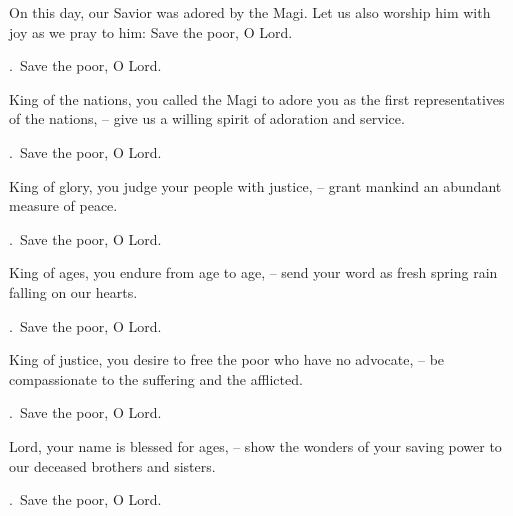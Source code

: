 \lettrine[loversize=0.15,lines=2]{O}{}n this day, our Savior was adored by the Magi. Let us also worship him with joy as we pray to him: Save the poor, O Lord.
\par \Rbar.~Save the poor, O Lord.

King of the nations, you called the Magi to adore you as the first representatives of the nations,
– give us a willing spirit of adoration and service.
\par \Rbar.~Save the poor, O Lord.

King of glory, you judge your people with justice,
– grant mankind an abundant measure of peace.
\par \Rbar.~Save the poor, O Lord.

King of ages, you endure from age to age,
– send your word as fresh spring rain falling on our hearts.
\par \Rbar.~Save the poor, O Lord.

King of justice, you desire to free the poor who have no advocate,
– be compassionate to the suffering and the afflicted.
\par \Rbar.~Save the poor, O Lord.

Lord, your name is blessed for ages,
– show the wonders of your saving power to our deceased brothers and sisters.
\par \Rbar.~Save the poor, O Lord.
